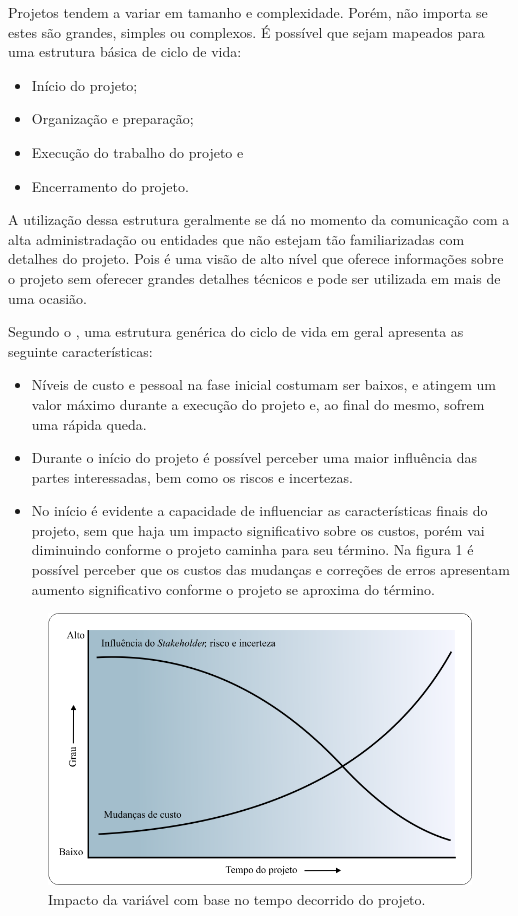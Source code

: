 \documentclass[12pt,a4paper,ruledheader,tocpage=prefix,floatnumber=continuous,pagestart=folhaderosto,font=times]{abnt}
\begin{document}
Projetos tendem a variar em tamanho e complexidade. Porém, não importa se estes são grandes, simples ou complexos. É possível que sejam mapeados para uma
estrutura básica de ciclo de vida\cite{PMBOK2008}:

\begin{itemize}
 \item Início do projeto;
 \item Organização e preparação;
 \item Execução do trabalho do projeto e
 \item Encerramento do projeto.
\end{itemize}

A utilização dessa estrutura geralmente se dá no momento da comunicação com a alta administradação ou entidades que não estejam tão familiarizadas com detalhes
do projeto. Pois é uma visão de alto nível que oferece informações sobre o projeto sem oferecer grandes detalhes técnicos e pode ser utilizada em mais de uma
ocasião.

Segundo o , uma estrutura genérica do ciclo de vida em geral apresenta as seguinte características:

\begin{itemize}
 \item Níveis de custo e pessoal na fase inicial costumam ser baixos, e atingem um valor máximo durante a execução do projeto e, ao final do mesmo, sofrem
       uma rápida queda.
 \item Durante o início do projeto é possível perceber uma maior influência das partes interessadas, bem como os riscos e incertezas.
 \item No início é evidente a capacidade de influenciar as características finais do projeto, sem que haja um impacto significativo sobre os custos, porém
       vai diminuindo conforme o projeto caminha para seu término. Na figura 1 é possível perceber que os custos das mudanças e correções de erros
       apresentam aumento significativo conforme o projeto se aproxima do término.
\end{itemize}

\begin{figure}[H]
\centering
\includegraphics[width=.7\textwidth]{img/fig1.png}
\caption{Impacto da variável com base no tempo decorrido do projeto\cite{PMBOK2008}.}
\end{figure}
\end{document}
